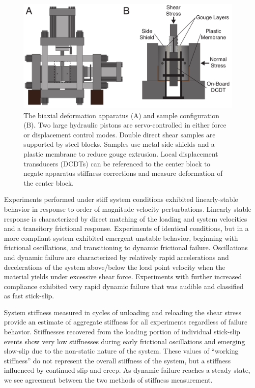 \documentclass[11pt]{article}
\begin{document}
\begin{figure}
	\centering
	\includegraphics[scale=0.5]{../Figures/Fig_Biax_Schematic/biax_schematic.pdf}
   	\caption{The biaxial deformation apparatus (A) and sample configuration (B). Two large
hydraulic pistons are servo-controlled in either force or displacement control
modes. Double direct shear samples are supported by steel blocks. Samples use
metal side shields and a plastic membrane to reduce gouge extrusion.  Local
displacement transducers (DCDTs) can be referenced to the center block to
negate apparatus stiffness corrections and measure deformation of the
center block.}
  	\label{Fig:Biax Schematic}
\end{figure}

Experiments performed under stiff system conditions exhibited linearly-stable
behavior in response to order of magnitude velocity perturbations.
Linearly-stable response is characterized by direct matching of the loading and
system velocities and a transitory frictional response. Experiments of identical
conditions, but in a more compliant system exhibited emergent unstable behavior,
beginning with frictional oscillations, and transitioning to dynamic frictional
failure. Oscillations and dynamic failure are characterized by relatively rapid
accelerations and decelerations of the system above/below the load point
velocity when the material yields under excessive shear force. Experiments with
further increased compliance exhibited very rapid dynamic failure that was
audible and classified as fast stick-slip.

System stiffness measured in cycles of unloading and reloading the shear stress
provide an estimate of aggregate stiffness for all experiments regardless of
failure behavior. Stiffnesses recovered from the loading portion of individual
stick-slip events show very low stiffnesses during early frictional oscillations
and emerging slow-slip due to the non-static nature of the system. These values
of “working stiffness” do not represent the overall stiffness of the system, but
a stiffness influenced by continued slip and creep. As dynamic failure reaches a
steady state, we see agreement between the two methods of stiffness measurement.
\end{document}
